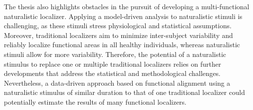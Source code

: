 The thesis also highlights obstacles in the pursuit of developing a
multi-functional naturalistic localizer.
%
Applying a model-driven analysis to naturalistic stimuli is challenging, as
these stimuli stress physiological and statistical assumptions.
%
Moreover, traditional localizers aim to minimize inter-subject variability and
reliably localize functional areas in all healthy individuals, whereas
naturalistic stimuli allow for more variability.
Therefore, the potential of a naturalistic stimulus to replace one or multiple
traditional localizers relies on further developments that address the
statistical and methodological challenges.
%
Nevertheless, a data-driven approach based on functional alignment using a
naturalistic stimulus of similar duration to that of one traditional localizer
could potentially estimate the results of many functional localizers.
